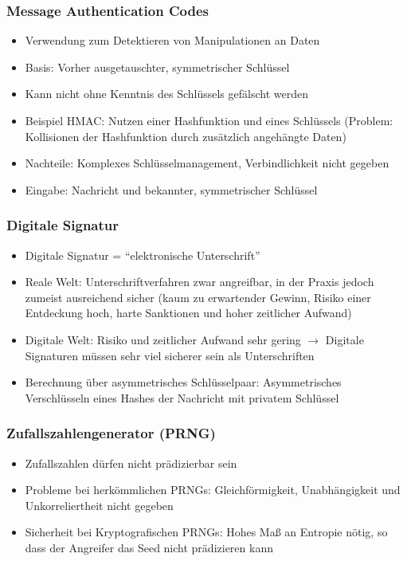 \subsubsection{Message Authentication Codes}
\begin{itemize}
	\item Verwendung zum Detektieren von Manipulationen an Daten
	\item Basis: Vorher ausgetauschter, symmetrischer Schlüssel
	\item Kann nicht ohne Kenntnis des Schlüssels gefälscht werden
	\item Beispiel HMAC: Nutzen einer Hashfunktion und eines Schlüssels (Problem: Kollisionen der Hashfunktion durch zusätzlich angehängte Daten)
	\item Nachteile: Komplexes Schlüsselmanagement, Verbindlichkeit nicht gegeben
	\item Eingabe: Nachricht und bekannter, symmetrischer Schlüssel
\end{itemize}

\subsubsection{Digitale Signatur}
\begin{itemize}
	\item Digitale Signatur = "`elektronische Unterschrift"'
	\item Reale Welt: Unterschriftverfahren zwar angreifbar, in der Praxis jedoch zumeist ausreichend sicher (kaum zu erwartender Gewinn, Risiko einer Entdeckung hoch, harte Sanktionen und hoher zeitlicher Aufwand)
	\item Digitale Welt: Risiko und zeitlicher Aufwand sehr gering $\rightarrow$ Digitale Signaturen müssen sehr viel sicherer sein als Unterschriften
	\item Berechnung über asymmetrisches Schlüsselpaar: Asymmetrisches Verschlüsseln eines Hashes der Nachricht mit privatem Schlüssel
\end{itemize}

\subsubsection{Zufallszahlengenerator (PRNG)}
\begin{itemize}
	\item Zufallszahlen dürfen nicht prädizierbar sein
	\item Probleme bei herkömmlichen PRNGs: Gleichförmigkeit, Unabhängigkeit und Unkorreliertheit nicht gegeben
	\item Sicherheit bei Kryptografischen PRNGs: Hohes Maß an Entropie nötig, so dass der Angreifer das Seed nicht prädizieren kann
\end{itemize}

